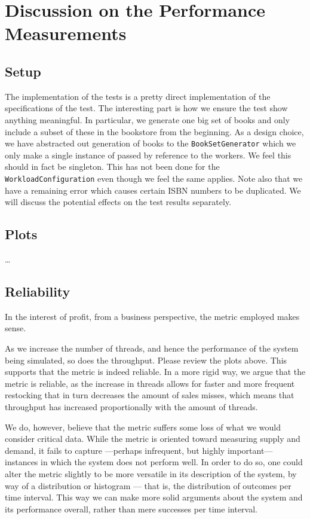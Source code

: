 
\section{Discussion on the Performance Measurements}

\subsection{Setup}
The implementation of the tests is a pretty direct implementation of the
specifications of the test. The interesting part is how we ensure the test
show anything meaningful. In particular, we generate one big set of books and
only include a subset of these in the bookstore from the beginning. As a
design choice, we have abstracted out generation of books to the
{\tt BookSetGenerator} which we only make a single instance of passed by
reference to the workers. We feel this should in fact be singleton. This has
not been done for the {\tt WorkloadConfiguration} even though we feel the same
applies. Note also that we have a remaining error which causes certain ISBN
numbers to be duplicated. We will discuss the potential effects on the test
results separately.

\subsection{Plots}
\dots

\subsection{Reliability}
In the interest of profit, from a business perspective, the metric employed
makes sense.

As we increase the number of threads, and hence the performance of the system
being simulated, so does the throughput. Please review the plots above. This
supports that the metric is indeed reliable. In a more rigid way, we argue that
the metric is reliable, as the increase in threads allows for faster and more
frequent restocking that in turn decreases the amount of sales misses, which
means that throughput has increased proportionally with the amount of threads.

We do, however, believe that the metric suffers some loss of what we would
consider critical data. While the metric is oriented toward measuring supply
and demand, it fails to capture ---perhaps infrequent, but highly important---
instances in which the system does not perform well. In order to do so, one
could alter the metric slightly to be more versatile in its description of the
system, by way of a distribution or histogram --- that is, the distribution of
outcomes per time interval. This way we can make more solid arguments about the
system and its performance overall, rather than mere successes per time interval.
